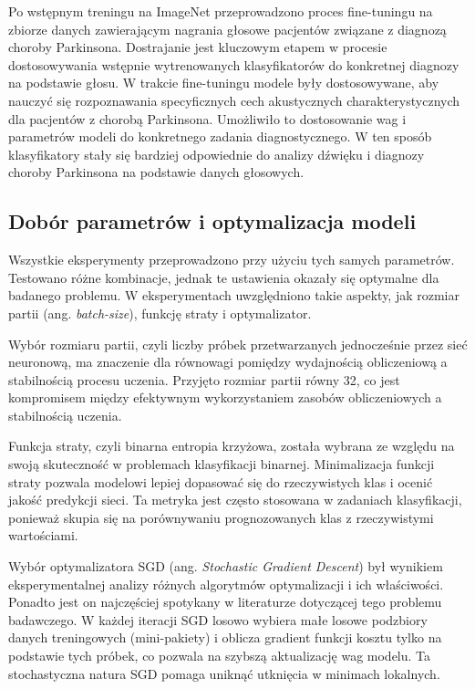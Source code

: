 Po wstępnym treningu na ImageNet przeprowadzono proces fine-tuningu na zbiorze danych zawierającym nagrania głosowe pacjentów związane z diagnozą choroby Parkinsona.
Dostrajanie jest kluczowym etapem w procesie dostosowywania wstępnie wytrenowanych klasyfikatorów do konkretnej diagnozy na podstawie głosu.
W trakcie fine-tuningu modele były dostosowywane, aby nauczyć się rozpoznawania specyficznych cech akustycznych charakterystycznych dla pacjentów z chorobą Parkinsona.
Umożliwiło to dostosowanie wag i parametrów modeli do konkretnego zadania diagnostycznego.
W ten sposób klasyfikatory stały się bardziej odpowiednie do analizy dźwięku i diagnozy choroby Parkinsona na podstawie danych głosowych.

\subsection{Dobór parametrów i optymalizacja modeli}
\label{subsec:optymalizacja-modeli}

Wszystkie eksperymenty przeprowadzono przy użyciu tych samych parametrów.
Testowano różne kombinacje, jednak te ustawienia okazały się optymalne dla badanego problemu.
W eksperymentach uwzględniono takie aspekty, jak rozmiar partii (ang. \emph{batch-size}), funkcję  straty i optymalizator.

Wybór rozmiaru partii, czyli liczby próbek przetwarzanych jednocześnie przez sieć neuronową, ma znaczenie dla równowagi pomiędzy wydajnością obliczeniową a stabilnością procesu  uczenia.
Przyjęto rozmiar partii równy 32, co jest kompromisem między efektywnym wykorzystaniem zasobów obliczeniowych a stabilnością uczenia.

Funkcja straty, czyli binarna entropia krzyżowa, została wybrana ze względu na swoją skuteczność w problemach klasyfikacji binarnej.
Minimalizacja funkcji straty pozwala modelowi lepiej dopasować się do rzeczywistych klas i ocenić jakość predykcji sieci.
Ta metryka jest często stosowana w zadaniach klasyfikacji, ponieważ skupia się na porównywaniu prognozowanych klas z rzeczywistymi wartościami.

Wybór optymalizatora SGD (ang. \emph{Stochastic Gradient Descent}) był wynikiem eksperymentalnej analizy różnych algorytmów optymalizacji i ich właściwości.
Ponadto jest on najczęściej spotykany w literaturze dotyczącej tego problemu badawczego.
W każdej iteracji SGD losowo wybiera małe losowe podzbiory danych treningowych (mini-pakiety) i oblicza gradient funkcji kosztu tylko na podstawie tych próbek, co pozwala na szybszą aktualizację wag modelu.
Ta stochastyczna natura SGD pomaga uniknąć utknięcia w minimach lokalnych.


